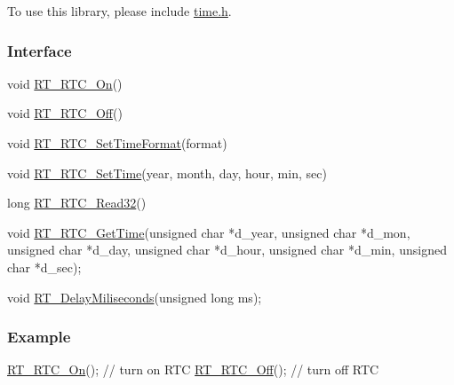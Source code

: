 To use this library, please include {\ttfamily \mbox{\hyperlink{a00053}{time.\+h}}}.

\subsubsection*{Interface}


\begin{DoxyCode}
\textcolor{keywordtype}{void} \mbox{\hyperlink{a00053_abcec88fd1699e238435a90f1b49f01fc}{RT\_RTC\_On}}()

void \mbox{\hyperlink{a00053_ad065bdfa3138a773950a7d5e9e9f863a}{RT\_RTC\_Off}}()

\textcolor{keywordtype}{void} \mbox{\hyperlink{a00053_a4342706ea208fe0adff35bfa3c78b87c}{RT\_RTC\_SetTimeFormat}}(format)

\textcolor{keywordtype}{void} \mbox{\hyperlink{a00053_a8929da3f9ad422dd07f18d603c63b7b7}{RT\_RTC\_SetTime}}(year, month, day, hour, min, sec)

\textcolor{keywordtype}{long} \mbox{\hyperlink{a00053_a61ac395d30cde55137bf04acaec570f0}{RT\_RTC\_Read32}}()

\textcolor{keywordtype}{void} \mbox{\hyperlink{a00053_ae30dec10f77cab56a66ee070fbe6a490}{RT\_RTC\_GetTime}}(\textcolor{keywordtype}{unsigned} \textcolor{keywordtype}{char} *d\_year, \textcolor{keywordtype}{unsigned} \textcolor{keywordtype}{char} *d\_mon, \textcolor{keywordtype}{unsigned} \textcolor{keywordtype}{char} *d\_day,
               \textcolor{keywordtype}{unsigned} \textcolor{keywordtype}{char} *d\_hour, \textcolor{keywordtype}{unsigned} \textcolor{keywordtype}{char} *d\_min, \textcolor{keywordtype}{unsigned} \textcolor{keywordtype}{char} *d\_sec);

\textcolor{keywordtype}{void} \mbox{\hyperlink{a00053_a960534919351d6e419e70a78521e87da}{RT\_DelayMiliseconds}}(\textcolor{keywordtype}{unsigned} \textcolor{keywordtype}{long} ms);
\end{DoxyCode}


\subsubsection*{Example}


\begin{DoxyCode}
\mbox{\hyperlink{a00053_abcec88fd1699e238435a90f1b49f01fc}{RT\_RTC\_On}}();     \textcolor{comment}{// turn on RTC}
\mbox{\hyperlink{a00053_ad065bdfa3138a773950a7d5e9e9f863a}{RT\_RTC\_Off}}();    \textcolor{comment}{// turn off RTC}
\end{DoxyCode}
 